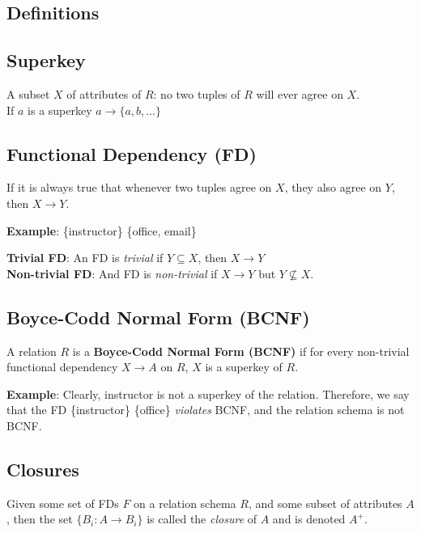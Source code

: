 \documentclass{../cheatsheet}
\begin{document}
\begin{multicols*}{2}
    \section{Definitions}
    \subsection{Superkey}
    A subset $X$ of attributes of $R$: no two tuples of $R$ will ever agree on
    $X$.\\
    If $a$ is a superkey $a \rightarrow \{a, b, \dots\}$

    \subsection{Functional Dependency (FD)}
    If it is always true that whenever two tuples agree on $X$, they also agree
    on $Y$, then $X \rightarrow Y$.

    \textbf{Example}: \{instructor\} \textrightarrow \{office, email\}

    \textbf{Trivial FD}: An FD is \textit{trivial} if $Y \subseteq X$, then $X
    \rightarrow Y$\\
    \textbf{Non-trivial FD}: And FD is \textit{non-trivial} if $X \rightarrow Y$
    but $Y \not\subseteq X$.

    \subsection{Boyce-Codd Normal Form (BCNF)}
    A relation $R$ is a \textbf{Boyce-Codd Normal Form (BCNF)} if for every
    non-trivial functional dependency $X \rightarrow A$ on $R$, $X$ is a superkey of
    $R$.

    \textbf{Example}: Clearly, instructor is not a superkey of the relation.
    Therefore, we say that the FD \{instructor\} \textrightarrow \{office\}
    \textit{violates} BCNF, and the relation schema is not BCNF.

    \subsection{Closures}
    Given some set of FDs $F$ on a relation schema $R$, and some subset of
    attributes $A$, then the set $\{B_i : A \rightarrow B_i \}$ is called the
    \textit{closure} of $A$ and is denoted $A^+$.


\end{multicols*}
\end{document}
